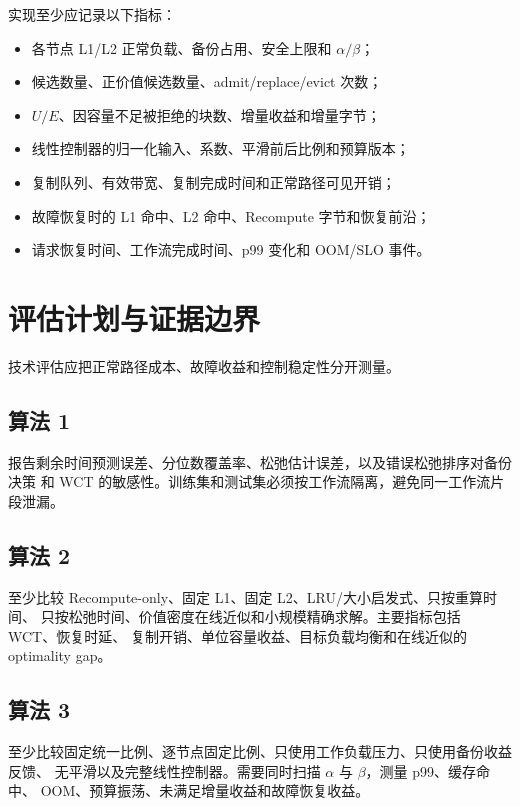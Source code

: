 \documentclass[UTF8,11pt,a4paper,fontset=fandol]{ctexart}
\begin{document}
实现至少应记录以下指标：

\begin{itemize}
  \item 各节点 L1/L2 正常负载、备份占用、安全上限和 $\alpha/\beta$；
  \item 候选数量、正价值候选数量、admit/replace/evict 次数；
  \item $U/E$、因容量不足被拒绝的块数、增量收益和增量字节；
  \item 线性控制器的归一化输入、系数、平滑前后比例和预算版本；
  \item 复制队列、有效带宽、复制完成时间和正常路径可见开销；
  \item 故障恢复时的 L1 命中、L2 命中、Recompute 字节和恢复前沿；
  \item 请求恢复时间、工作流完成时间、p99 变化和 OOM/SLO 事件。
\end{itemize}

\section{评估计划与证据边界}

技术评估应把正常路径成本、故障收益和控制稳定性分开测量。

\subsection{算法 1}

报告剩余时间预测误差、分位数覆盖率、松弛估计误差，以及错误松弛排序对备份决策
和 WCT 的敏感性。训练集和测试集必须按工作流隔离，避免同一工作流片段泄漏。

\subsection{算法 2}

至少比较 Recompute-only、固定 L1、固定 L2、LRU/大小启发式、只按重算时间、
只按松弛时间、价值密度在线近似和小规模精确求解。主要指标包括 WCT、恢复时延、
复制开销、单位容量收益、目标负载均衡和在线近似的 optimality gap。

\subsection{算法 3}

至少比较固定统一比例、逐节点固定比例、只使用工作负载压力、只使用备份收益反馈、
无平滑以及完整线性控制器。需要同时扫描 $\alpha$ 与 $\beta$，测量 p99、缓存命中、
OOM、预算振荡、未满足增量收益和故障恢复收益。
\end{document}

